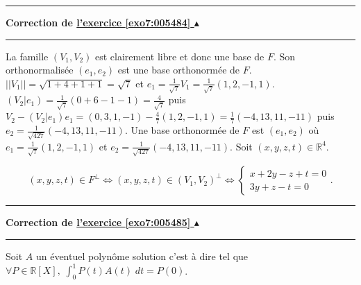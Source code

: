 \documentclass[11pt,a4paper]{article}
\newcommand{\Rr}{\mathbb{R}} \newcommand{\R}{\mathbb{R}}
\newcounter{exo}
\newcommand{\correction}[1]{\hypertarget{cor7:#1}{}\label{cor7:#1}{\bf Correction de \hyperlink{exo7:#1}{l'exercice \ref{exo7:#1} $\blacktriangle$}}\vspace{1mm}\hrule\vspace{1mm}}
\newcommand{\fincorrection}{\vspace{1mm}\hrule\vspace*{7mm}}
\begin{document}
\fincorrection
\correction{005484}
La famille $(V_1,V_2)$ est clairement libre et donc une base de $F$. Son orthonormalisée $(e_1,e_2)$ est une base orthonormée de $F$.
$||V_1||=\sqrt{1+4+1+1}=\sqrt{7}$ et $e_1=\frac{1}{\sqrt{7}}V_1=\frac{1}{\sqrt{7}}(1,2,-1,1)$.
$(V_2|e_1)=\frac{1}{\sqrt{7}}(0+6-1-1)=\frac{4}{\sqrt{7}}$  puis $V_2-(V_2|e_1)e_1=(0,3,1,-1)-\frac{4}{7} (1,2,-1,1)=\frac{1}{7}(-4,13,11,-11)$ puis $e_2=\frac{1}{\sqrt{427}}(-4,13,11,-11)$.
Une base orthonormée de $F$ est $(e_1,e_2)$ où $e_1=\frac{1}{\sqrt{7}}(1,2,-1,1)$ et $e_2=\frac{1}{\sqrt{427}}(-4,13,11,-11)$.
Soit $(x,y,z,t)\in\Rr^4$.

$$(x,y,z,t)\in F^\bot\Leftrightarrow(x,y,z,t)\in(V_1,V_2)^\bot\Leftrightarrow\left\{
\begin{array}{l}
x+2y-z+t=0\\
3y+z-t=0
\end{array}
\right..$$
\fincorrection
\correction{005485}
Soit $A$ un éventuel polynôme solution c'est à dire tel que $\forall P\in\Rr[X],\;\int_{0}^{1}P(t)A(t)\;dt=P(0)$.
\end{document}
